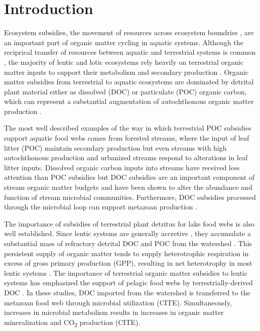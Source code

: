 \section{Introduction}
Ecosystem subsidies, the movement of resources across ecosystem boundries \cite{Polis_1997}, are an important part of organic matter cycling in aquatic systems. Although the reciprical transfer of resources between aquatic and terrestrial systems is common \cite{Nakano_2001}, the majority of lentic and lotic ecosystems rely heavily on terrestrial organic matter inputs to support their metabolism and secondary production \cite{Marcarelli_2011}. Organic matter subsidies from terrestrial to aquatic ecosystems are dominated by detrital plant material either as dissolved (DOC) or particulate (POC) organic carbon, which can represent a substantial augmentation of autochthonous organic matter production \cite{Hodkinson_1975,GASITH_1976,wetzel_1984,WETZEL_1995,Webster_1997,Kobayashi_2011,Mehring_2014}.   

The most well described examples of the way in which terrestrial POC subsidies support aquatic food webs comes from forested streams, where the input of leaf litter (POC) maintain secondary production \cite{wallaceetal_1999}  but even streams with high autochthonous production \cite{Mineau_2012} and urbanized streams \cite{Duan_2014} respond to alterations in leaf litter inputs. Dissolved organic carbon inputs into streams have received less attention than POC subsidies but DOC subsidies are an important component of stream organic matter budgets \cite{McDowell_1976} and have been shown to alter the abundance \cite{Bott_1984} and function \cite{Bernhardt_2002} of stream microbial communities. Furthermore, DOC subsidies processed through the microbial loop can support metazoan production \cite{Hall_1998,Wilcox_2005}.

The importance of subsidies of terrestrial plant detritus for lake food webs is also well established. Since lentic systems are generally accretive \cite{WETZEL_2001}, they accumulate a substantial mass of refractory detrital DOC and POC from the watershed \cite{Rich_1978,wetzel_1984,WETZEL_1995}. This persistent supply of organic matter tends to supply heterotrophic respiration in excess of gross primary production (GPP), resulting in net heterotrophy in most lentic systems \cite{Cole_2000, Marcarelli_2011}. The importance of terrestrial organic matter subsidies to lentic systems has emphasized the support of pelagic food webs by terrestrially-derived DOC \cite{Carpenter_2005} \cite{Cole_2006} \cite{Pace_2004, Cottingham_2013, Fey_2015}. In these studies, DOC imported from the watershed is transferred to the metazoan food web through microbial utilization (CITE). Simultaneously, increases in microbial metabolism results in increases in organic matter mineralization and CO\textsubscript{2} production (CITE). 

